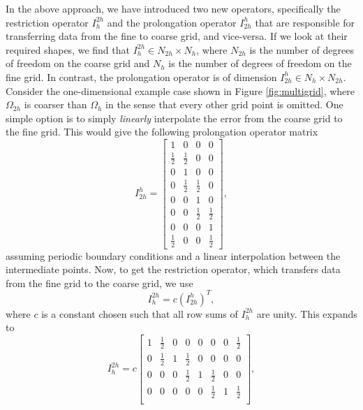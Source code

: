In the above approach, we have introduced two new operators, specifically the restriction operator $I_{h}^{2h}$ and the prolongation operator $I_{2h}^{h}$ that are responsible for transferring data from the fine to coarse grid, and vice-versa. If we look at their required shapes, we find that $I_{h}^{2h} \in N_{2h} \times N_h$, where $N_{2h}$ is the number of degrees of freedom on the coarse grid and $N_h$ is the number of degrees of freedom on the fine grid. In contrast, the prolongation operator is of dimension $I_{2h}^{h} \in N_{h} \times N_{2h}$. Consider the one-dimensional example case shown in Figure \ref{fig:multigrid}, where $\Omega_{2h}$ is coarser than $\Omega_h$ in the sense that every other grid point is omitted. One simple option is to simply {\it linearly} interpolate the error from the coarse grid to the fine grid. This would give the following prolongation operator matrix
\begin{equation}
	I_{2h}^{h} = 
	\begin{bmatrix}
	    1 & 0 & 0 & 0 \\
			\frac{1}{2} & \frac{1}{2} & 0 & 0 \\
			0 & 1 & 0 & 0 \\
			0 & \frac{1}{2} & \frac{1}{2} & 0 \\
	    0 & 0 & 1 & 0 \\
			0 & 0 & \frac{1}{2} & \frac{1}{2} \\
			0 & 0 & 0 & 1 \\
			\frac{1}{2} & 0 & 0 & \frac{1}{2}
	\end{bmatrix},
\end{equation}
assuming periodic boundary conditions and a linear interpolation between the intermediate points. Now, to get the restriction operator, which transfers data from the fine grid to the coarse grid, we use
\begin{equation}
	I_{h}^{2h} = c (I_{2h}^{h})^T,
\end{equation}
where $c$ is a constant chosen such that all row sums of $I_{h}^{2h}$ are unity. This expands to
\begin{equation}
	I_{h}^{2h} = c
	\begin{bmatrix}
	    1 & \frac{1}{2} & 0 & 0 & 0 & 0 & 0 & \frac{1}{2} \\
			0 & \frac{1}{2} & 1 & \frac{1}{2} & 0 & 0 & 0 & 0 \\
			0 & 0 & 0 & \frac{1}{2} & 1 & \frac{1}{2} & 0 & 0 \\
			0 & 0 & 0 & 0 & 0 & \frac{1}{2} & 1 & \frac{1}{2} \\
	\end{bmatrix},
\end{equation}
